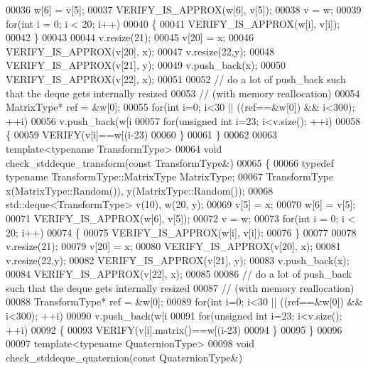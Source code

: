 \begin{DoxyCode}
00036   w[6] = v[5];
00037   VERIFY\_IS\_APPROX(w[6], v[5]);
00038   v = w;
00039   \textcolor{keywordflow}{for}(\textcolor{keywordtype}{int} i = 0; i < 20; i++)
00040   \{
00041     VERIFY\_IS\_APPROX(w[i], v[i]);
00042   \}
00043 
00044   v.resize(21);
00045   v[20] = x;
00046   VERIFY\_IS\_APPROX(v[20], x);
00047   v.resize(22,y);
00048   VERIFY\_IS\_APPROX(v[21], y);
00049   v.push\_back(x);
00050   VERIFY\_IS\_APPROX(v[22], x);
00051 
00052   \textcolor{comment}{// do a lot of push\_back such that the deque gets internally resized}
00053   \textcolor{comment}{// (with memory reallocation)}
00054   MatrixType* ref = &w[0];
00055   \textcolor{keywordflow}{for}(\textcolor{keywordtype}{int} i=0; i<30 || ((ref==&w[0]) && i<300); ++i)
00056     v.push\_back(w[i%
00057   \textcolor{keywordflow}{for}(\textcolor{keywordtype}{unsigned} \textcolor{keywordtype}{int} i=23; i<v.size(); ++i)
00058   \{
00059     VERIFY(v[i]==w[(i-23)%
00060   \}
00061 \}
00062 
00063 \textcolor{keyword}{template}<\textcolor{keyword}{typename} TransformType>
00064 \textcolor{keywordtype}{void} check\_stddeque\_transform(\textcolor{keyword}{const} TransformType&)
00065 \{
00066   \textcolor{keyword}{typedef} \textcolor{keyword}{typename} TransformType::MatrixType MatrixType;
00067   TransformType x(MatrixType::Random()), y(MatrixType::Random());
00068   std::deque<TransformType> v(10), w(20, y);
00069   v[5] = x;
00070   w[6] = v[5];
00071   VERIFY\_IS\_APPROX(w[6], v[5]);
00072   v = w;
00073   \textcolor{keywordflow}{for}(\textcolor{keywordtype}{int} i = 0; i < 20; i++)
00074   \{
00075     VERIFY\_IS\_APPROX(w[i], v[i]);
00076   \}
00077 
00078   v.resize(21);
00079   v[20] = x;
00080   VERIFY\_IS\_APPROX(v[20], x);
00081   v.resize(22,y);
00082   VERIFY\_IS\_APPROX(v[21], y);
00083   v.push\_back(x);
00084   VERIFY\_IS\_APPROX(v[22], x);
00085 
00086   \textcolor{comment}{// do a lot of push\_back such that the deque gets internally resized}
00087   \textcolor{comment}{// (with memory reallocation)}
00088   TransformType* ref = &w[0];
00089   \textcolor{keywordflow}{for}(\textcolor{keywordtype}{int} i=0; i<30 || ((ref==&w[0]) && i<300); ++i)
00090     v.push\_back(w[i%
00091   \textcolor{keywordflow}{for}(\textcolor{keywordtype}{unsigned} \textcolor{keywordtype}{int} i=23; i<v.size(); ++i)
00092   \{
00093     VERIFY(v[i].matrix()==w[(i-23)%
00094   \}
00095 \}
00096 
00097 \textcolor{keyword}{template}<\textcolor{keyword}{typename} QuaternionType>
00098 \textcolor{keywordtype}{void} check\_stddeque\_quaternion(\textcolor{keyword}{const} QuaternionType&)

\end{DoxyCode}
